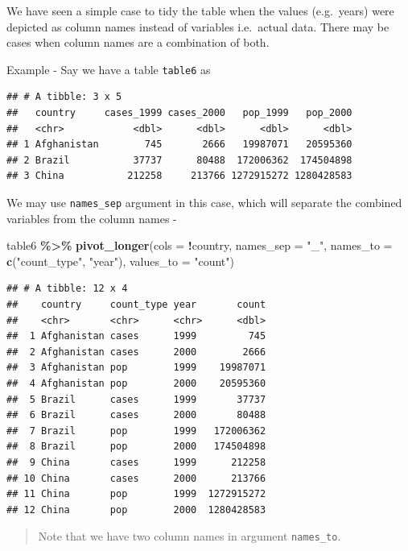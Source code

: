 \documentclass[
]{book}
\newenvironment{Shaded}{\begin{snugshade}}{\end{snugshade}}
\newcommand{\AttributeTok}[1]{\textcolor[rgb]{0.13,0.29,0.53}{#1}}
\newcommand{\FunctionTok}[1]{\textcolor[rgb]{0.13,0.29,0.53}{\textbf{#1}}}
\newcommand{\NormalTok}[1]{#1}
\newcommand{\SpecialCharTok}[1]{\textcolor[rgb]{0.81,0.36,0.00}{\textbf{#1}}}
\newcommand{\StringTok}[1]{\textcolor[rgb]{0.31,0.60,0.02}{#1}}
\begin{document}
We have seen a simple case to tidy the table when the values (e.g.~years) were depicted as column names instead of variables i.e.~actual data. There may be cases when column names are a combination of both.

Example - Say we have a table \texttt{table6} as

\begin{verbatim}
## # A tibble: 3 x 5
##   country     cases_1999 cases_2000   pop_1999   pop_2000
##   <chr>            <dbl>      <dbl>      <dbl>      <dbl>
## 1 Afghanistan        745       2666   19987071   20595360
## 2 Brazil           37737      80488  172006362  174504898
## 3 China           212258     213766 1272915272 1280428583
\end{verbatim}

We may use \texttt{names\_sep} argument in this case, which will separate the combined variables from the column names -

\begin{Shaded}
\begin{Highlighting}[]
\NormalTok{table6 }\SpecialCharTok{\%\textgreater{}\%} 
  \FunctionTok{pivot\_longer}\NormalTok{(}\AttributeTok{cols =} \SpecialCharTok{!}\NormalTok{country,}
               \AttributeTok{names\_sep =} \StringTok{"\_"}\NormalTok{,}
               \AttributeTok{names\_to =} \FunctionTok{c}\NormalTok{(}\StringTok{"count\_type"}\NormalTok{, }\StringTok{"year"}\NormalTok{),}
               \AttributeTok{values\_to =} \StringTok{"count"}\NormalTok{)}
\end{Highlighting}
\end{Shaded}

\begin{verbatim}
## # A tibble: 12 x 4
##    country     count_type year       count
##    <chr>       <chr>      <chr>      <dbl>
##  1 Afghanistan cases      1999         745
##  2 Afghanistan cases      2000        2666
##  3 Afghanistan pop        1999    19987071
##  4 Afghanistan pop        2000    20595360
##  5 Brazil      cases      1999       37737
##  6 Brazil      cases      2000       80488
##  7 Brazil      pop        1999   172006362
##  8 Brazil      pop        2000   174504898
##  9 China       cases      1999      212258
## 10 China       cases      2000      213766
## 11 China       pop        1999  1272915272
## 12 China       pop        2000  1280428583
\end{verbatim}

\begin{quote}
Note that we have two column names in argument \texttt{names\_to}.
\end{quote}
\end{document}

